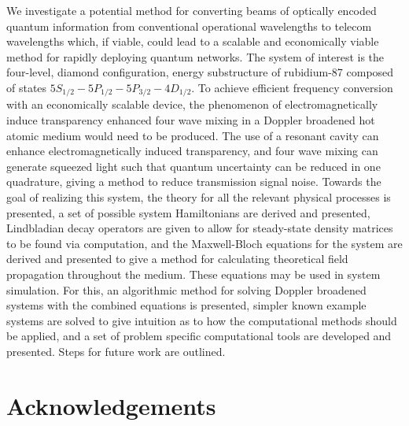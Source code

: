 \documentclass[aps,pra,showpacs,amsmath,amssymb,nofootinbib,longbibliography,superscriptaddress
]{revtex4-1}
\theoremstyle{definition}
\theoremstyle{remark}
\newcommand{\0}{\hat{0}}
\begin{document}
We investigate a potential method for converting beams of optically encoded quantum information from conventional operational wavelengths to telecom wavelengths which, if viable, could lead to a scalable and economically viable method for rapidly deploying quantum networks. The system of interest is the four-level, diamond configuration, energy substructure of rubidium-87 composed of states $5S_{1/2} - 5P_{1/2} - 5P_{3/2} - 4D_{1/2}$. To achieve efficient frequency conversion with an economically scalable device, the phenomenon of electromagnetically induce transparency enhanced four wave mixing in a Doppler broadened hot atomic medium would need to be produced. The use of a resonant cavity can enhance electromagnetically induced transparency, and four wave mixing can generate squeezed light such that quantum uncertainty can be reduced in one quadrature, giving a method to reduce transmission signal noise. Towards the goal of realizing this system, the theory for all the relevant physical processes is presented, a set of possible system Hamiltonians are derived and presented, Lindbladian decay operators are given to allow for steady-state density matrices to be found via computation, and the Maxwell-Bloch equations for the system are derived and presented to give a method for calculating theoretical field propagation throughout the medium. These equations may be used in system simulation. For this, an algorithmic method for solving Doppler broadened systems with the combined equations is presented, simpler known example systems are solved to give intuition as to how the computational methods should be applied, and a set of problem specific computational tools are developed and presented. Steps for future work are outlined.


\clearpage

\tableofcontents
{}

\pagebreak

\listoffigures
{}

\clearpage

\begingroup
\titleformat{\section}[block]{\Large\bfseries\filcenter}{}{0em}{}
\section*{Acknowledgements}
\endgroup
\end{document}
